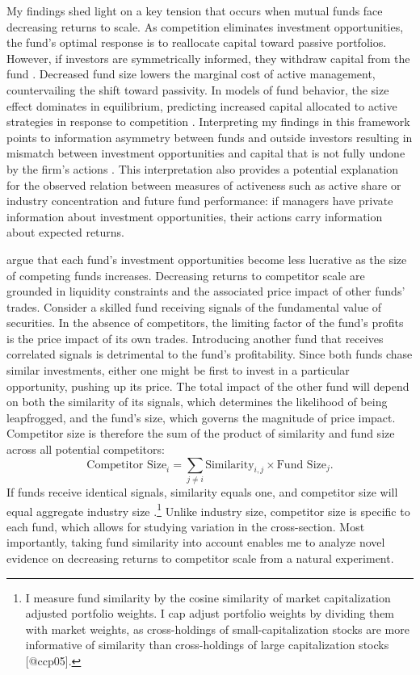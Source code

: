 \documentclass[]{book}
\let\rmarkdownfootnote\footnote%
\def\footnote{\protect\rmarkdownfootnote}
\theoremstyle{definition}
\theoremstyle{definition}
\theoremstyle{definition}
\theoremstyle{remark}
\begin{document}
My findings shed light on a key tension that occurs when mutual funds
face decreasing returns to scale. As competition eliminates investment
opportunities, the fund's optimal response is to reallocate capital
toward passive portfolios. However, if investors are symmetrically
informed, they withdraw capital from the fund \citep{bg04}. Decreased
fund size lowers the marginal cost of active management, countervailing
the shift toward passivity. In models of fund behavior, the size effect
dominates in equilibrium, predicting increased capital allocated to
active strategies in response to competition \citep{pst17L}.
Interpreting my findings in this framework points to information
asymmetry between funds and outside investors resulting in mismatch
between investment opportunities and capital that is not fully undone by
the firm's actions \citep{bbl17}. This interpretation also provides a
potential explanation for the observed relation between measures of
activeness such as active share \citep{cp09} or industry concentration
\citep{ksz05} and future fund performance: if managers have private
information about investment opportunities, their actions carry
information about expected returns.

\citet{ps12} argue that each fund's investment opportunities become less
lucrative as the size of competing funds increases. Decreasing returns
to competitor scale are grounded in liquidity constraints and the
associated price impact of other funds' trades. Consider a skilled fund
receiving signals of the fundamental value of securities. In the absence
of competitors, the limiting factor of the fund's profits is the price
impact of its own trades. Introducing another fund that receives
correlated signals is detrimental to the fund's profitability. Since
both funds chase similar investments, either one might be first to
invest in a particular opportunity, pushing up its price. The total
impact of the other fund will depend on both the similarity of its
signals, which determines the likelihood of being leapfrogged, and the
fund's size, which governs the magnitude of price impact. Competitor
size is therefore the sum of the product of similarity and fund size
across all potential competitors: \[
\text{Competitor Size}_i = \sum_{j\neq i} \text{Similarity}_{i,j} \times \text{Fund Size}_j.
\] If funds receive identical signals, similarity equals one, and
competitor size will equal aggregate industry size
\citep{pst15}.\footnote{
I measure fund similarity by the cosine similarity of market capitalization adjusted portfolio weights. I cap adjust portfolio weights by dividing them with market weights, as cross-holdings of small-capitalization stocks are more informative of similarity than cross-holdings of large capitalization stocks [@ccp05].
} Unlike industry size, competitor size is specific to each fund, which
allows for studying variation in the cross-section. Most importantly,
taking fund similarity into account enables me to analyze novel evidence
on decreasing returns to competitor scale from a natural experiment.
\end{document}
